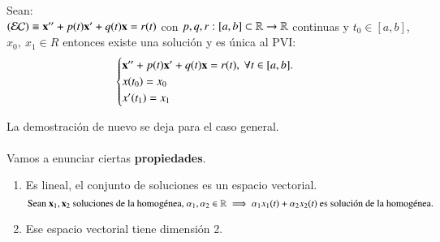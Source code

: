 \begin{thm}\label{thm:exist-unic-ii}
    Sean: \\$(\mathcal{EC}) \equiv \mathbf{x}'' + p(t)\mathbf{x}' + q(t) \mathbf{x} = r(t)$ con $p, q, r: [a, b] \subset \mathbb{R} \to \mathbb{R}$ continuas y $t_0 \in [a, b]$, $x_0,\ x_1 \in R$ entonces existe una solución y es única al PVI:
    $$
        \begin{cases}
            \mathbf{x}'' + p(t)\mathbf{x}' + q(t)\mathbf{x} = r(t),\ \forall t \in [a, b].\\
            x(t_0) = x_0\\
            x'(t_1) = x_1\\
        \end{cases}
    $$
\end{thm}
La demostración de nuevo se deja para el caso general.\\\\
Vamos a enunciar ciertas \textbf{propiedades}.
\begin{enumerate} \label{properties:ecua-lin-ii}
    \item Es lineal, el conjunto de soluciones es un espacio vectorial.
    $$
        \text{Sean } \mathbf{x}_1, \mathbf{x}_2 \text{ soluciones de la homogénea, } \alpha_1, \alpha_2 \in \mathbb{R} \implies \alpha_1 x_1(t) + \alpha_2 x_2(t) \text{ es solución de la homogénea.}
    $$
    \item Ese espacio vectorial tiene dimensión 2.
\end{enumerate}
